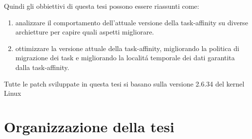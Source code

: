 Quindi gli obbiettivi di questa tesi possono essere riassunti come:

\begin{enumerate}
\item analizzare il comportamento dell'attuale versione della task-affinity su diverse archietture per capire quali aspetti migliorare.
\item ottimizzare la versione attuale della task-affinity, migliorando la politica di migrazione dei task e migliorando la localit\'a temporale dei dati 
garantita dalla task-affinity.
\end{enumerate}

Tutte le patch sviluppate in questa tesi si basano sulla versione 2.6.34 del kernel Linux 

\section{Organizzazione della tesi}
\label{sec:OrganizzazioneTesi}

